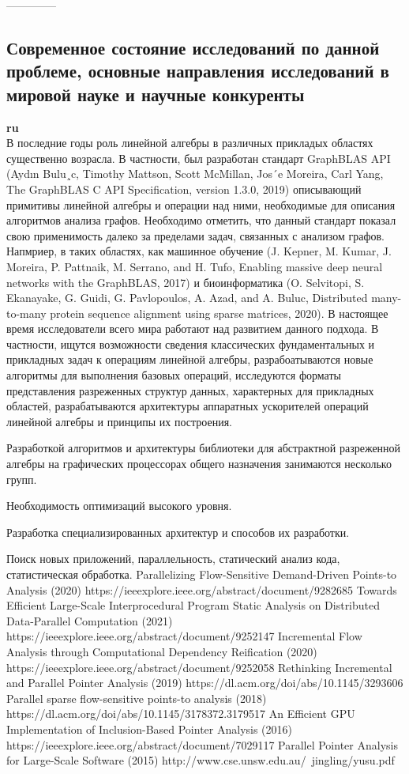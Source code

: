 \documentclass[12pt]{article}  %
\theoremstyle{remark}
\begin{document}
--------------


\subsection{Современное состояние исследований по данной проблеме, основные направления исследований в мировой науке и научные конкуренты}

\textbf{ru}\\

В последние годы роль линейной алгебры в различных прикладых областях существенно возрасла. В частности, был разработан стандарт GraphBLAS API (Aydın Bulu¸c, Timothy Mattson, Scott McMillan, Jos´e Moreira, Carl Yang, The GraphBLAS C API Specification, version 1.3.0, 2019) описывающий примитивы линейной алгебры и операции над ними, необходимые для описания алгоритмов анализа графов. Необходимо отметить, что данный стандарт показал свою применимость далеко за пределами задач, связанных с анализом графов. Напмриер, в таких областях, как машинное обучение (J. Kepner, M. Kumar, J. Moreira, P. Pattnaik, M. Serrano, and H. Tufo, Enabling massive deep neural networks with the GraphBLAS, 2017) и биоинформатика (O. Selvitopi, S. Ekanayake, G. Guidi, G. Pavlopoulos, A. Azad, and A. Buluc, Distributed many-to-many protein sequence alignment using sparse matrices, 2020). В настоящее время исследователи всего мира работают над развитием данного подхода. В частности, ищутся возможности сведения классических фундаментальных и прикладных задач к операциям линейной алгебры, разрабоатываются новые алгоритмы для выполнения базовых операций, исследуются форматы представления разреженных структур данных, характерных для прикладных областей, разрабатываются архитектуры аппаратных ускорителей операций линейной алгебры и принципы их построения.



Разработкой алгоритмов и архитектуры библиотеки для абстрактной разреженной алгебры на графических процессорах общего назначения занимаются несколько групп. 

Необходимость оптимизаций высокого уровня.

Разработка специализированных архитектур и способов их разработки.

Поиск новых приложений, параллельность, статический анализ кода, статистическая обработка.
Parallelizing Flow-Sensitive Demand-Driven Points-to Analysis (2020) https://ieeexplore.ieee.org/abstract/document/9282685
Towards Efficient Large-Scale Interprocedural Program Static Analysis on Distributed Data-Parallel Computation (2021) https://ieeexplore.ieee.org/abstract/document/9252147
Incremental Flow Analysis through Computational Dependency Reification (2020) https://ieeexplore.ieee.org/abstract/document/9252058
Rethinking Incremental and Parallel Pointer Analysis (2019) https://dl.acm.org/doi/abs/10.1145/3293606
Parallel sparse flow-sensitive points-to analysis (2018) https://dl.acm.org/doi/abs/10.1145/3178372.3179517
An Efficient GPU Implementation of Inclusion-Based Pointer Analysis (2016) https://ieeexplore.ieee.org/abstract/document/7029117
Parallel Pointer Analysis for Large-Scale Software (2015) http://www.cse.unsw.edu.au/~jingling/yusu.pdf
\end{document}
